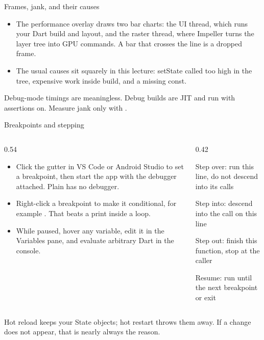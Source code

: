 \documentclass[10pt,aspectratio=169,t]{beamer}
\begin{document}
\begin{frame}[eyebrow=Debugging]{Frames, jank, and their causes}
  \vskip 2mm
  \begin{itemize}
    \item The performance overlay draws two bar charts: the UI thread, which runs your Dart build and layout, and the raster thread, where Impeller turns the layer tree into GPU commands. A bar that crosses the line is a dropped frame.
    \item The usual causes sit squarely in this lecture: setState called too high in the tree, expensive work inside build, and a missing const.
  \end{itemize}
  \vskip 3mm
  \begin{takeaway}{Debug-mode timings are meaningless.}
    Debug builds are JIT and run with assertions on. Measure jank only with .
  \end{takeaway}
\end{frame}

\begin{frame}[eyebrow=Debugging]{Breakpoints and stepping}
  \begin{columns}[T]
    \begin{column}{0.54\textwidth}
      \begin{itemize}
        \item Click the gutter in VS Code or Android Studio to set a breakpoint, then start the app with the debugger attached. Plain  has no debugger.
        \item Right-click a breakpoint to make it conditional, for example . That beats a print inside a loop.
        \item While paused, hover any variable, edit it in the Variables pane, and evaluate arbitrary Dart in the console.
      \end{itemize}
    \end{column}
    \begin{column}{0.42\textwidth}
      \begin{steps}
        \item Step over: run this line, do not descend into its calls
        \item Step into: descend into the call on this line
        \item Step out: finish this function, stop at the caller
        \item Resume: run until the next breakpoint or exit
      \end{steps}
    \end{column}
  \end{columns}
  \begin{takeaway}{Hot reload keeps your State objects; hot restart throws them away.}
    If a change does not appear, that is nearly always the reason.
  \end{takeaway}
\end{frame}
\end{document}
